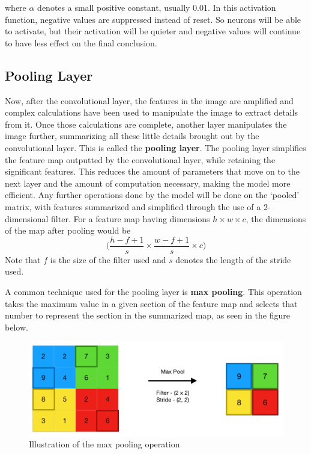 \begin{flushleft}
        where $\alpha$ denotes a small positive constant, usually 0.01. In this activation function, negative values are suppressed instead of reset. So neurons will be able to activate, but their activation will be quieter and negative values will continue to have less effect on the final conclusion.

    \subsection{Pooling Layer}
        \large Now, after the convolutional layer, the features in the image are amplified and complex calculations have been used to manipulate the image to extract details from it. Once those calculations are complete, another layer manipulates the image further, summarizing all these little details brought out by the convolutional layer. This is called the \textbf{pooling layer}. The pooling layer simplifies the feature map outputted by the convolutional layer, while retaining the significant features. This reduces the amount of parameters that move on to the next layer and the amount of computation necessary, making the model more efficient. Any further operations done by the model will be done on the `pooled' matrix, with features summarized and simplified through the use of a 2-dimensional filter. For a feature map having dimensions $h \times w \times c$, the dimensions of the map after pooling would be 
        $$\biggl( \frac{h - f + 1}{s} \times \frac{w - f + 1}{s} \times c \biggr)$$
        Note that $f$ is the size of the filter used and $s$ denotes the length of the stride used. \newline

        A common technique used for the pooling layer is \textbf{max pooling}. This operation takes the maximum value in a given section of the feature map and selects that number to represent the section in the summarized map, as seen in the figure below. 

        \begin{figure}[H]
            \centering
            \includegraphics[width=0.75\linewidth]{cv/maxpooling.png}
            \caption{Illustration of the max pooling operation}
            \label{fig:maxpooling}
        \end{figure}


\end{flushleft}
